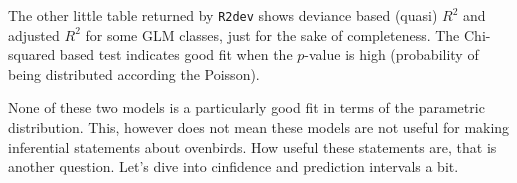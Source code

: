 \documentclass[12pt,]{book}
\newenvironment{Shaded}{\begin{snugshade}}{\end{snugshade}}
\newcommand{\DataTypeTok}[1]{\textcolor[rgb]{0.13,0.29,0.53}{#1}}
\newcommand{\DecValTok}[1]{\textcolor[rgb]{0.00,0.00,0.81}{#1}}
\newcommand{\FloatTok}[1]{\textcolor[rgb]{0.00,0.00,0.81}{#1}}
\newcommand{\KeywordTok}[1]{\textcolor[rgb]{0.13,0.29,0.53}{\textbf{#1}}}
\newcommand{\NormalTok}[1]{#1}
\newcommand{\OperatorTok}[1]{\textcolor[rgb]{0.81,0.36,0.00}{\textbf{#1}}}
\newcommand{\StringTok}[1]{\textcolor[rgb]{0.31,0.60,0.02}{#1}}
\begin{document}
The other little table returned by \texttt{R2dev} shows deviance based (quasi) \(R^2\) and adjusted
\(R^2\) for some GLM classes, just for the sake of completeness. The Chi-squared based
test indicates good fit when the \(p\)-value is high (probability of being distributed
according the Poisson).

None of these two models is a particularly good fit in terms
of the parametric distribution.
This, however does not mean these models are not useful for making inferential statements
about ovenbirds. How useful these statements are, that is another question.
Let's dive into cinfidence and prediction intervals a bit.

\begin{Shaded}
\end{Shaded}
\end{document}
